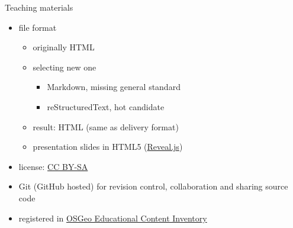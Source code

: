 \documentclass[xcolor={dvipsnames,usenames},beamer]{beamer}
\begin{document}
\begin{frame}{Teaching materials}

\begin{itemize}
 \item file format
 \begin{itemize}
  \item originally HTML
  \item selecting new one
  \begin{itemize}
   \item Markdown, missing general standard
   \item reStructuredText, hot candidate
  \end{itemize}
  \item result: HTML (same as delivery format)
  \item presentation slides in HTML5 (\href{http://lab.hakim.se/reveal-js}{Reveal.js})
 \end{itemize}
 \item license: \href{https://creativecommons.org/licenses/by-sa/4.0/}{CC BY-SA}
 \item Git (GitHub hosted)
  {\scriptsize for revision control, collaboration and sharing source code}
 \item registered in \href{http://www.osgeo.org/educational_content}{OSGeo Educational Content Inventory}
\end{itemize}


\end{frame}
\end{document}
